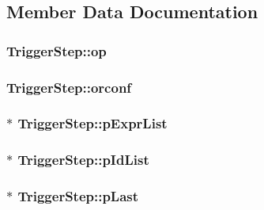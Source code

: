 \subsection{Member Data Documentation}
\hypertarget{struct_trigger_step_a20269855c80d869d498fcb93401832fd}{
\subsubsection[{op}]{ Trigger\-Step\-::op}}\label{struct_trigger_step_a20269855c80d869d498fcb93401832fd}
\hypertarget{struct_trigger_step_a4ed8b2571fde96e84f637184453e73e3}{
\subsubsection[{orconf}]{ Trigger\-Step\-::orconf}}\label{struct_trigger_step_a4ed8b2571fde96e84f637184453e73e3}
\hypertarget{struct_trigger_step_a607602af65ecf6c7e6cac4ea8532ac1d}{
\subsubsection[{p\-Expr\-List}]{$\ast$ Trigger\-Step\-::p\-Expr\-List}}\label{struct_trigger_step_a607602af65ecf6c7e6cac4ea8532ac1d}
\hypertarget{struct_trigger_step_a6b91bf578544104f8bd4bd5b958ddd8c}{
\subsubsection[{p\-Id\-List}]{$\ast$ Trigger\-Step\-::p\-Id\-List}}\label{struct_trigger_step_a6b91bf578544104f8bd4bd5b958ddd8c}
\hypertarget{struct_trigger_step_a0aae9ea7f436881c0e9e614476a69584}{
\subsubsection[{p\-Last}]{$\ast$ Trigger\-Step\-::p\-Last}}\label{struct_trigger_step_a0aae9ea7f436881c0e9e614476a69584}
